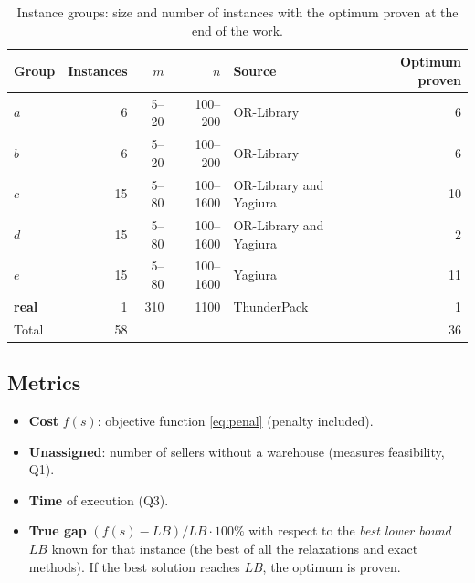 \documentclass[11pt,a4paper]{article}
\begin{document}
\begin{table}[ht]
\centering
\caption{Instance groups: size and number of instances with the optimum proven at the end of the
work.}
\label{tab:grupos}
\small
\begin{tabular}{l r r r l r}
\toprule
Group & Instances & $m$ & $n$ & Source & Optimum proven \\
\midrule
$a$ & 6  & 5--20 & 100--200  & OR-Library & 6 \\
$b$ & 6  & 5--20 & 100--200  & OR-Library & 6 \\
$c$ & 15 & 5--80 & 100--1600 & OR-Library and Yagiura & 10 \\
$d$ & 15 & 5--80 & 100--1600 & OR-Library and Yagiura & 2 \\
$e$ & 15 & 5--80 & 100--1600 & Yagiura & 11 \\
\textbf{real} & 1 & 310 & 1100 & ThunderPack & 1 \\
\midrule
Total & 58 & & & & 36 \\
\bottomrule
\end{tabular}
\end{table}

\subsection{Metrics}
\begin{itemize}
  \item \textbf{Cost} $f(s)$: objective function \eqref{eq:penal} (penalty included).
  \item \textbf{Unassigned}: number of sellers without a warehouse (measures feasibility, Q1).
  \item \textbf{Time} of execution (Q3).
  \item \textbf{True gap} $(f(s)-LB)/LB\cdot 100\%$ with respect to the \emph{best lower bound}
        $LB$ known for that instance (the best of all the relaxations and exact methods). If the
        best solution reaches $LB$, the optimum is proven.
\end{itemize}
\end{document}
